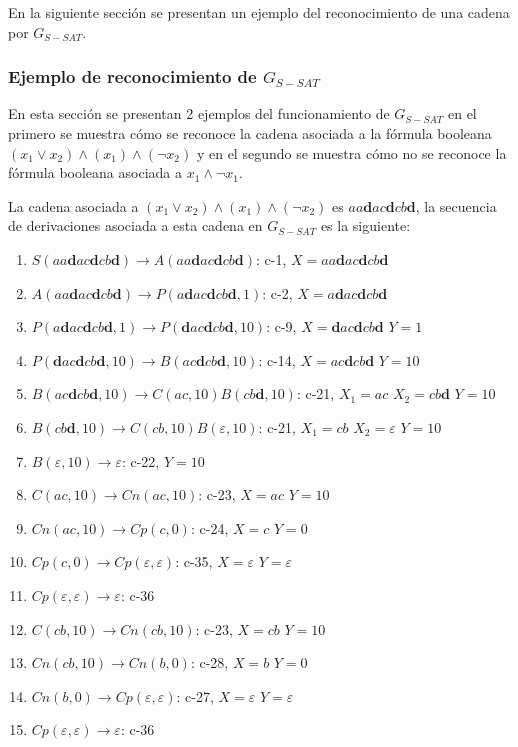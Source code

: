 En la siguiente sección se presentan un ejemplo del reconocimiento de una cadena por $G_{S-SAT}$.

\subsubsection{Ejemplo de reconocimiento de $G_{S-SAT}$}

En esta sección se presentan 2 ejemplos del funcionamiento de $G_{S-SAT}$ en el primero se muestra cómo se
reconoce la cadena asociada a la fórmula booleana $(x_1 \vee x_2) \wedge (x_1) \wedge (\neg x_2)$ y en el
segundo se muestra cómo no se reconoce la fórmula booleana asociada a $x_1 \wedge \neg x_1$.

La cadena asociada a $(x_1 \vee x_2) \wedge (x_1) \wedge (\neg x_2)$ es $aa\mathbf{d}ac\mathbf{d}cb\mathbf{d}$, la secuencia de derivaciones
asociada a esta cadena en $G_{S-SAT}$ es la siguiente:

\begin{enumerate}
    \item $S(aa\mathbf{d}ac\mathbf{d}cb\mathbf{d})\to A(aa\mathbf{d}ac\mathbf{d}cb\mathbf{d})$: c-1, $X=aa\mathbf{d}ac\mathbf{d}cb\mathbf{d}$
    \item $A(aa\mathbf{d}ac\mathbf{d}cb\mathbf{d})\to P(a\mathbf{d}ac\mathbf{d}cb\mathbf{d},1)$: c-2, $X=a\mathbf{d}ac\mathbf{d}cb\mathbf{d}$
    \item $P(a\mathbf{d}ac\mathbf{d}cb\mathbf{d},1)\to P(\mathbf{d}ac\mathbf{d}cb\mathbf{d},10)$: c-9, $X=\mathbf{d}ac\mathbf{d}cb\mathbf{d}$ $Y=1$
    \item $P(\mathbf{d}ac\mathbf{d}cb\mathbf{d},10)\to B(ac\mathbf{d}cb\mathbf{d}, 10)$: c-14, $X=ac\mathbf{d}cb\mathbf{d}$ $Y=10$
    \item $B(ac\mathbf{d}cb\mathbf{d}, 10)\to C(ac,10) B(cb\mathbf{d},10)$: c-21, $X_1=ac$ $X_2=cb\mathbf{d}$ $Y=10$
    \item $B(cb\mathbf{d},10)\to C(cb,10) B(\varepsilon,10)$: c-21, $X_1=cb$ $X_2=\varepsilon$ $Y=10$
    \item $B(\varepsilon,10)\to \varepsilon$: c-22, $Y=10$
    \item $C(ac,10)\to Cn(ac,10)$: c-23, $X=ac$ $Y=10$
    \item $Cn(ac,10)\to Cp(c,0)$: c-24, $X=c$ $Y=0$
    \item $Cp(c,0)\to Cp(\varepsilon,\varepsilon)$: c-35, $X=\varepsilon$ $Y=\varepsilon$
    \item $Cp(\varepsilon, \varepsilon) \to \varepsilon$: c-36
    \item $C(cb,10)\to Cn(cb,10)$: c-23, $X=cb$ $Y=10$
    \item $Cn(cb,10)\to Cn(b,0)$: c-28, $X=b$ $Y=0$
    \item $Cn(b,0)\to Cp(\varepsilon,\varepsilon)$: c-27, $X=\varepsilon$ $Y=\varepsilon$
    \item $Cp(\varepsilon, \varepsilon) \to \varepsilon$: c-36
\end{enumerate}

